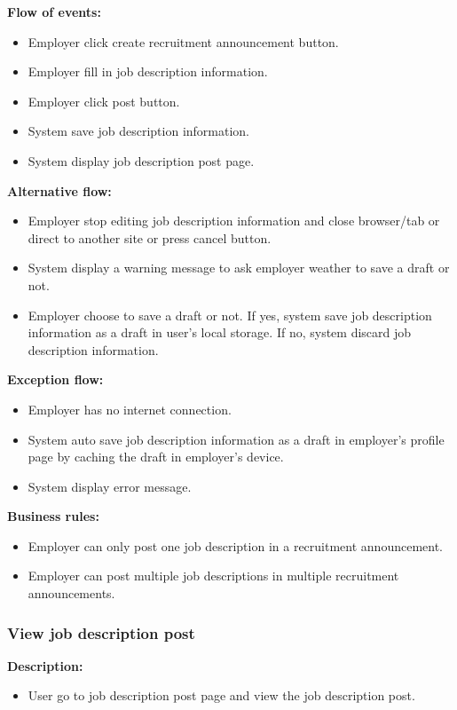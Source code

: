 \documentclass[a4paper]{article}
\begin{document}
        \textbf{Flow of events:}
        \begin{itemize}
            \item Employer click create recruitment announcement button.
            \item Employer fill in job description information.
            \item Employer click post button.
            \item System save job description information.
            \item System display job description post page.
        \end{itemize}

        \textbf{Alternative flow:}
        \begin{itemize}
            \item Employer stop editing job description information and close browser/tab or direct to another site or press cancel button.
            \item System display a warning message to ask employer weather to save a draft or not.
            \item Employer choose to save a draft or not. If yes, system save job description information as a draft in user's local storage. If no, system discard job description information.
        \end{itemize}

        \textbf{Exception flow:}
        \begin{itemize}
            \item Employer has no internet connection.
            \item System auto save job description information as a draft in employer's profile page by caching the draft in employer's device.
            \item System display error message.
        \end{itemize}

        \textbf{Business rules:}
        \begin{itemize}
            \item Employer can only post one job description in a recruitment announcement.
            \item Employer can post multiple job descriptions in multiple recruitment announcements.
        \end{itemize}

        \subsubsection{View job description post}
        \textbf{Description:}
        \begin{itemize}
            \item User go to job description post page and view the job description post.
        \end{itemize}
\end{document}
